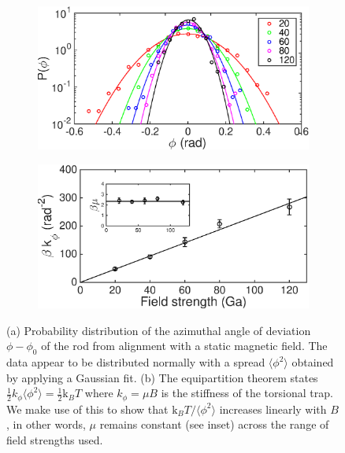 \documentclass[aps,prl,superscriptaddress]{revtex4-1}
\newcommand{\kk}{\mathrm{k}_B}
\begin{document}
\begin{figure}
	\begin{subfigure}[b]{0.48\columnwidth}
    	\includegraphics[width=\textwidth]{figs/Figure2a.eps}
    	\caption{}
    \end{subfigure}
    \begin{subfigure}[b]{0.48\columnwidth}
    	\includegraphics[width=\textwidth]{figs/Figure2b.eps}
    	\caption{}
    \end{subfigure}
    \caption{\footnotesize (a) Probability distribution of the azimuthal angle of deviation $\phi-\phi_0$ of the rod from alignment with a static magnetic field. The data appear to be distributed normally with a spread $\langle \phi^2 \rangle$ obtained by applying a Gaussian fit. (b) The equipartition theorem states $\frac{1}{2} k_\phi \langle \phi^2 \rangle = \frac{1}{2}\kk T$ where $k_\phi =\mu B$ is the stiffness of the torsional trap. We make use of this to show that $\kk T / \langle \phi^2 \rangle $ increases linearly with $B$, in other words, $\mu$ remains constant (see inset) across the range of field strengths used.\label{fig:trap}}
	\label{fig:moment}
\end{figure}
\end{document}
